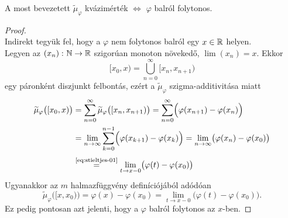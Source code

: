 \documentclass[
]{elteikthesis}[2024/04/26]
\begin{document}
	\begin{theorem}{}{}
		A most bevezetett \( \widetilde{\mu}_\varphi \) kvázimérték \( \iff \)
		\( \varphi \) balról folytonos.
	\end{theorem}
	\begin{proof}\,\\
		\Ifstep
		Indirekt tegyük fel,
		hogy a \( \varphi \) nem folytonos balról egy \( x \in \mathbb{R} \) helyen.\\[6pt]
		Legyen az \( (x_n) \,\colon \mathbb{N} \to \mathbb{R} \) szigorúan monoton növekedő, \( \lim(x_n) = x \).
		Ekkor
		\[
			[x_0, x) = \bigcup_{n=0}^{\infty} [x_n, x_{n + 1})
		\]
		egy páronként diszjunkt felbontás, 
		ezért a \(  \widetilde{\mu}_\varphi \) szigma-additivitása miatt
		\begin{align*}
			\widetilde{\mu}_\varphi \bigl( [x_0, x) \bigr)
			&= \sum_{n=0}^{\infty} \widetilde{\mu}_\varphi \bigl( [x_n, x_{n + 1}) \bigr)
			 = \sum_{n=0}^{\infty} \Bigl( \varphi( x_{n + 1} ) - \varphi( x_n ) \Bigr) \\
			&= \lim_{n \to \infty} \sum_{k=0}^{n - 1} 
			   \Bigl( \varphi( x_{k + 1} ) - \varphi( x_k ) \Bigr)
			 = \lim_{n \to \infty} 
			   \bigl( \varphi( x_n ) - \varphi( x_0 ) \bigr) \\[3pt]
			&\overset{\text{\ref{eq:stieltjes-01}}}{=}
			   \lim_{t \to x-0} 
			   \bigl( \varphi( t ) - \varphi( x_0 ) \bigr)
		\end{align*}
		Ugyanakkor az \( m \) halmazfüggvény definíciójából adódóan
		\[
			\widetilde{\mu}_\varphi \bigl( [x, x_0) \bigr) =
			\varphi( x ) - \varphi( x_0 ) =
			\lim_{t \to x-0}  \bigl( \varphi( t ) - \varphi( x_0 ) \bigr).
		\]
		Ez pedig pontosan azt jelenti, hogy a \( \varphi \) balról folytonos az \( x \)-ben.
		

\end{proof}
\end{document}
